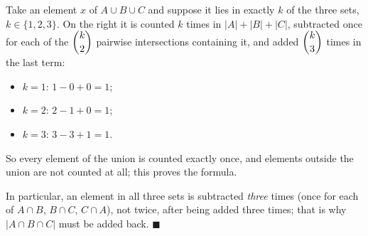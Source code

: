 Take an element $x$ of $A\cup B\cup C$ and suppose it lies in exactly $k$ of the three sets, $k\in\{1,2,3\}$. On the right it is counted $k$ times in $|A|+|B|+|C|$, subtracted once for each of the $\dbinom k2$ pairwise intersections containing it, and added $\dbinom k3$ times in the last term:
\begin{itemize}
\item $k=1$: $1-0+0=1$;
\item $k=2$: $2-1+0=1$;
\item $k=3$: $3-3+1=1$.
\end{itemize}
So every element of the union is counted exactly once, and elements outside the union are not counted at all; this proves the formula.

In particular, an element in all three sets is subtracted \emph{three} times (once for each of $A\cap B$, $B\cap C$, $C\cap A$), not twice, after being added three times; that is why $|A\cap B\cap C|$ must be added back. $\blacksquare$

